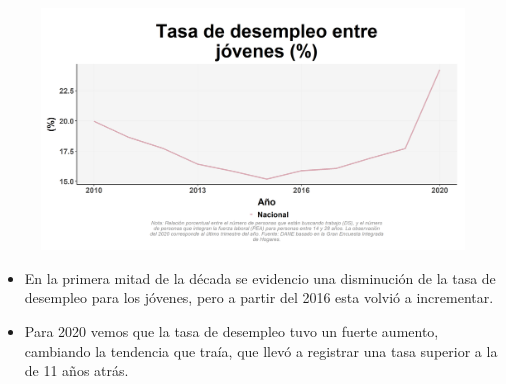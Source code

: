     \begin{figure}[H]
        \caption[Tasa de desempleo joven a nivel nacional ]{\label{desempjov_nal_trend} }
        \begin{center}
        \includegraphics[width=\textwidth,keepaspectratio]{img/var_56_trend.png}
        \end{center}
    \end{figure}
            \begin{itemize}
                \item En la primera mitad de la década se evidencio una disminución de la tasa de desempleo para los jóvenes, pero a partir del 2016 esta volvió a incrementar.
                \item Para 2020 vemos que la tasa de desempleo tuvo un fuerte aumento, cambiando la tendencia que traía, que llevó a registrar una tasa superior a la de 11 años atrás.
                \end{itemize}


